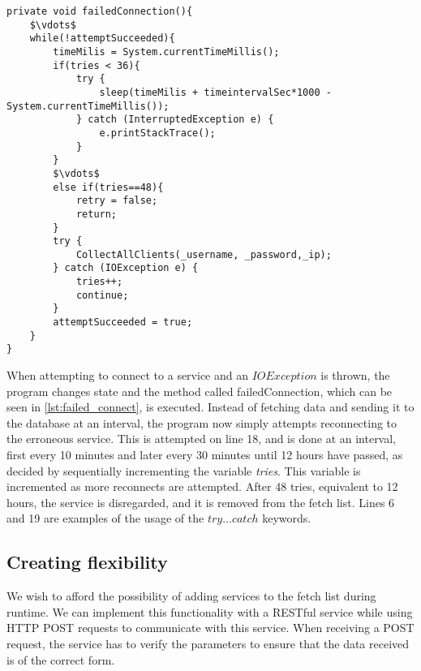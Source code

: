 \begin{lstlisting}[caption={Failed Connection snapshot},label={lst:failed_connect},language=inc_Java, mathescape]
private void failedConnection(){
	$\vdots$
    while(!attemptSucceeded){
        timeMilis = System.currentTimeMillis();
        if(tries < 36){
            try {
                sleep(timeMilis + timeintervalSec*1000 - System.currentTimeMillis());
            } catch (InterruptedException e) {
                e.printStackTrace();
            }
        }
        $\vdots$
        else if(tries==48){
        	retry = false;
            return;
        }
        try {
            CollectAllClients(_username, _password,_ip);
        } catch (IOException e) {
            tries++;
            continue;
        }
        attemptSucceeded = true;
    }
}
\end{lstlisting}

When attempting to connect to a service and an $IOException$ is thrown, the program changes state and the method called failedConnection, which can be seen in \cref{lst:failed_connect}, is executed. Instead of fetching data and sending it to the database at an interval, the program now simply attempts reconnecting to the erroneous service. This is attempted on line 18, and is done at an interval, first every 10 minutes and later every 30 minutes until 12 hours have passed, as decided by sequentially incrementing the variable \emph{tries}. This variable is incremented as more reconnects are attempted. After 48 tries, equivalent to 12 hours, the service is disregarded, and it is removed from the fetch list. Lines 6 and 19 are examples of the usage of the $try...catch$ keywords.

\subsection*{Creating flexibility}
We wish to afford the possibility of adding services to the fetch list during runtime. We can implement this functionality with a RESTful service while using HTTP POST requests to communicate with this service. When receiving a POST request, the service has to verify the parameters to ensure that the data received is of the correct form. 

